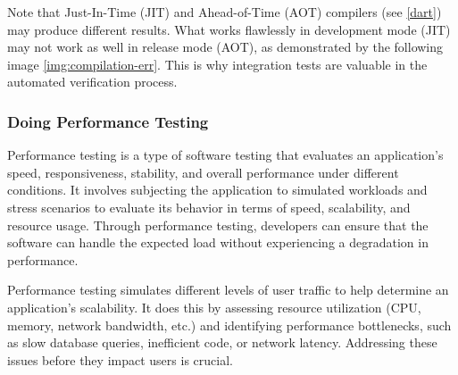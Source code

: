 Note that Just-In-Time (JIT) and Ahead-of-Time (AOT) compilers (see \ref{dart}) may produce different results. What 
works flawlessly in development mode (JIT) may not work as well in release mode (AOT), as demonstrated by the following 
image \cref{img:compilation-err}. This is why integration tests are valuable in the automated verification process.


\subsubsection{Doing Performance Testing}

Performance testing is a type of software testing that evaluates an application's speed, responsiveness, stability, and 
overall performance under different conditions. It involves subjecting the application to simulated workloads and stress 
scenarios to evaluate its behavior in terms of speed, scalability, and resource usage. Through performance testing, 
developers can ensure that the software can handle the expected load without experiencing a degradation in performance.

Performance testing simulates different levels of user traffic to help determine an application's scalability. It does 
this by assessing resource utilization (CPU, memory, network bandwidth, etc.) and identifying performance bottlenecks, 
such as slow database queries, inefficient code, or network latency. Addressing these issues before they impact users is 
crucial.

